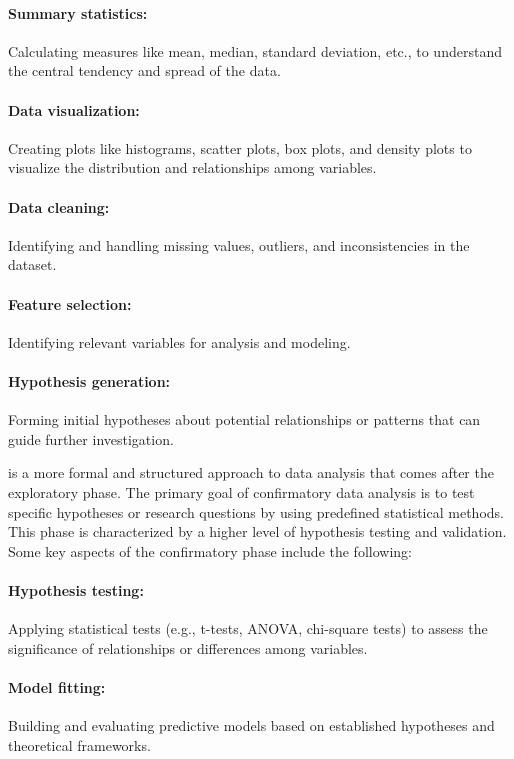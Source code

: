 \paragraph{Summary statistics:} Calculating measures like mean, median, standard deviation, etc., to understand the central tendency and spread of the data.
\paragraph{Data visualization:} Creating plots like histograms, scatter plots, box plots, and density plots to visualize the distribution and relationships among variables.
\paragraph{Data cleaning:} Identifying and handling missing values, outliers, and inconsistencies in the dataset.
\paragraph{Feature selection:} Identifying relevant variables for analysis and modeling.
\paragraph{Hypothesis generation:} Forming initial hypotheses about potential relationships or patterns that can guide further investigation.

\bigskip
{} is a more formal and structured approach to data analysis that comes after the exploratory phase. 
The primary goal of confirmatory data analysis is to test specific hypotheses or research questions by using predefined statistical methods. 
This phase is characterized by a higher level of hypothesis testing and validation. Some key aspects of the confirmatory phase include the following:

\paragraph{Hypothesis testing:} Applying statistical tests (e.g., t-tests, ANOVA, chi-square tests) to assess the significance of relationships or differences among variables.
\paragraph{Model fitting:} Building and evaluating predictive models based on established hypotheses and theoretical frameworks.
